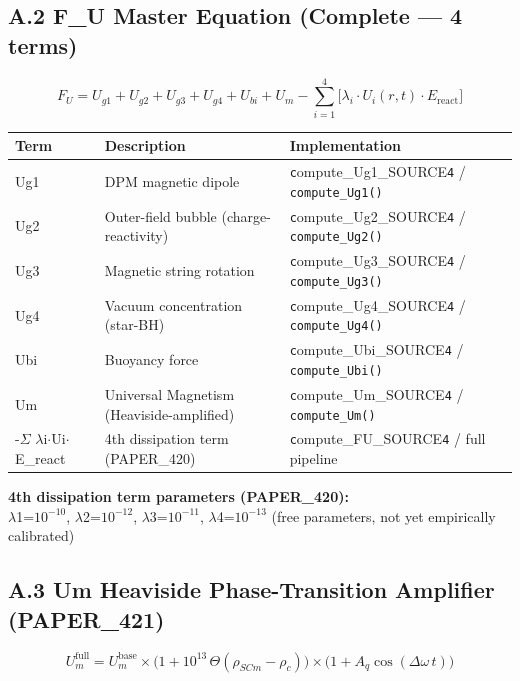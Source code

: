 \documentclass[12pt,a4paper]{article}
\begin{document}
\subsection{A.2 F\_U Master Equation (Complete --- 4 terms)}

\begin{equation}
F_U = U_{g1} + U_{g2} + U_{g3} + U_{g4} + U_{bi} + U_m - \sum_{i=1}^{4}\bigl[\lambda_i \cdot U_i(r,t) \cdot E_{\mathrm{react}}\bigr]
\end{equation}

\begin{table}[H]
\centering
\small
\begin{tabularx}{\linewidth}{@{}>{\raggedright\arraybackslash}X>{\raggedright\arraybackslash}X>{\raggedright\arraybackslash}X@{}}
\toprule
Term & Description & Implementation \tabularnewline
\midrule
Ug1 & DPM magnetic dipole & \texttt{c}ompute\_{Ug1\_SOURCE}\texttt{4} / \texttt{compute\_Ug1()} \tabularnewline
Ug2 & Outer-field bubble (charge-reactivity) & \texttt{c}ompute\_{Ug2\_SOURCE}\texttt{4} / \texttt{compute\_Ug2()} \tabularnewline
Ug3 & Magnetic string rotation & \texttt{c}ompute\_{Ug3\_SOURCE}\texttt{4} / \texttt{compute\_Ug3()} \tabularnewline
Ug4 & Vacuum concentration (star-BH) & \texttt{c}ompute\_{Ug4\_SOURCE}\texttt{4} / \texttt{compute\_Ug4()} \tabularnewline
Ubi & Buoyancy force & \texttt{c}ompute\_{Ubi\_SOURCE}\texttt{4} / \texttt{compute\_Ubi()} \tabularnewline
Um & Universal Magnetism (Heaviside-amplified) & \texttt{c}ompute\_{Um\_SOURCE}\texttt{4} / \texttt{compute\_Um()} \tabularnewline
-$\Sigma$ $\lambda$i$\cdot$Ui$\cdot$E\_react & 4th dissipation term (PAPER\_420) & \texttt{c}ompute\_{FU\_SOURCE}\texttt{4} / full pipeline \tabularnewline
\bottomrule
\end{tabularx}
\end{table}

\textbf{4th dissipation term parameters (PAPER\_420):} \\  $\lambda$1=$10^{-10}$, $\lambda$2=$10^{-12}$, $\lambda$3=$10^{-11}$, $\lambda$4=$10^{-13}$ (free parameters, not yet empirically calibrated)

\subsection{A.3 Um Heaviside Phase-Transition Amplifier (PAPER\_421)}

\begin{equation}
U_m^{\mathrm{full}} = U_m^{\mathrm{base}} \times \bigl(1 + 10^{13}\,\Theta(\rho_{SCm} - \rho_c)\bigr) \times \bigl(1 + A_q\cos(\Delta\omega\,t)\bigr)
\end{equation}
\end{document}
